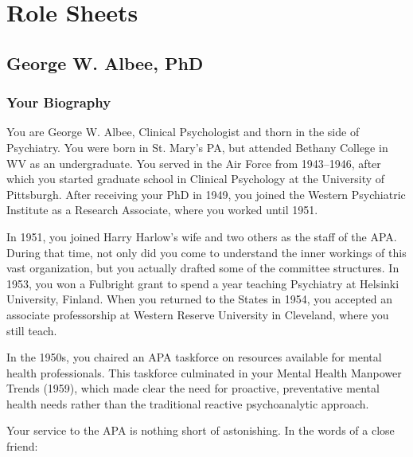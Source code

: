 \pagebreak 

 
\frontmatter
\tableofcontents
\newpage
\listoftables
\newpage
\listoffigures
\newpage

\renewcommand*{\thechapter}{\arabic{chapter}}
\setcounter{chapter}{0}
\mainmatter

\part{Role Sheets}
\label{rolesheets}

\begin{refsection}

\chapter{George W. Albee, PhD}
\label{georgew.albeephd}

\section{Your Biography}
\label{yourbiography}

You are George W. Albee, Clinical Psychologist and thorn in the side of Psychiatry. You were born in St. Mary's PA, but attended Bethany College in WV as an undergraduate. You served in the Air Force from 1943--1946, after which you started graduate school in Clinical Psychology at the University of Pittsburgh. After receiving your PhD in 1949, you joined the Western Psychiatric Institute as a Research Associate, where you worked until 1951.

In 1951, you joined Harry Harlow's wife and two others as the staff of the APA. During that time, not only did you come to understand the inner workings of this vast organization, but you actually drafted some of the committee structures. In 1953, you won a Fulbright grant to spend a year teaching Psychiatry at Helsinki University, Finland. When you returned to the States in 1954, you accepted an associate professorship at Western Reserve University in Cleveland, where you still teach.

In the 1950s, you chaired an APA taskforce on resources available for mental health professionals. This taskforce culminated in your Mental Health Manpower Trends (1959), which made clear the need for proactive, preventative mental health needs rather than the traditional reactive psychoanalytic approach.

Your service to the APA is nothing short of astonishing. In the words of a close friend:


\end{refsection}
